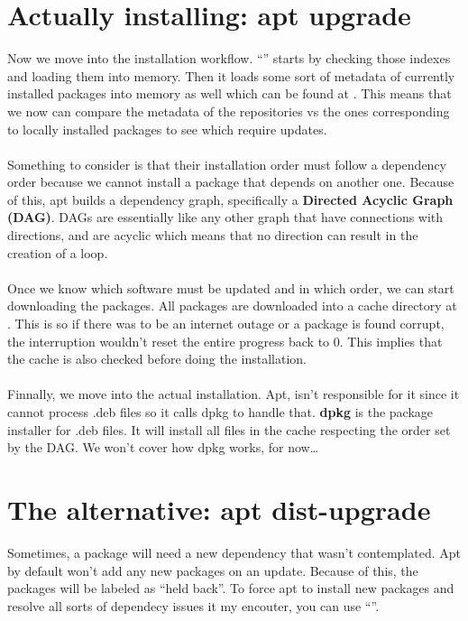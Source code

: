 \section{Actually installing: apt upgrade}

Now we move into the installation workflow. ``'' starts by checking those
indexes and loading them into memory. Then it loads some sort of metadata of currently installed
packages into memory as well which can be found at . This means that we now can compare the metadata of the repositories
vs the ones corresponding to locally installed packages to see which require updates.
\\ \\
Something to consider is that their installation order must follow a dependency order because
we cannot install a package that depends on another one. Because of this, apt builds a dependency
graph, specifically a \textbf{Directed Acyclic Graph (DAG)}. DAGs are essentially like any other
graph that have connections with directions, and are acyclic which means that no direction can 
result in the creation of a loop.
\\ \\
Once we know which software must be updated and in which order, we can start downloading the packages.
All packages are downloaded into a cache directory at . This
is so if there was to be an internet outage or a package is found corrupt, the interruption wouldn't
reset the entire progress back to 0. This implies that the cache is also checked before doing
the installation.
\\ \\
Finnally, we move into the actual installation. Apt, isn't responsible for it since it cannot 
process .deb files so it calls dpkg to handle that. \textbf{dpkg} is the package installer for .deb
files. It will install all files in the cache respecting the order set by the DAG. We won't cover
how dpkg works, for now\dots

\section{The alternative: apt dist-upgrade}

Sometimes, a package will need a new dependency that wasn't contemplated. Apt by default
won't add any new packages on an update. Because of this, the packages will be labeled as ``held
back''. To force apt to install new packages and resolve all sorts of dependecy issues it my encouter,
you can use ``''.

